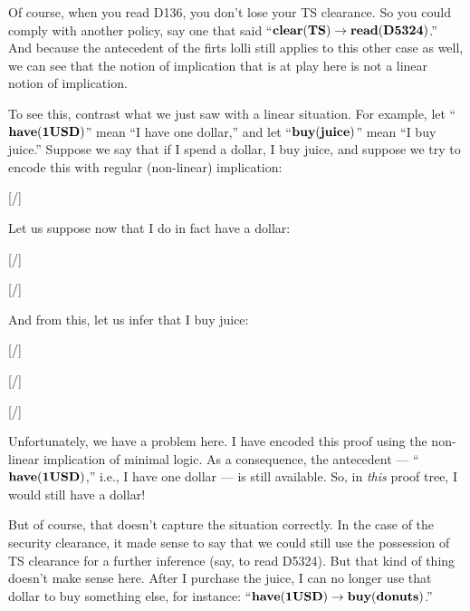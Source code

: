 \documentclass[../../../main.tex]{subfiles}
\begin{document}
Of course, when you read D136, you don't lose your TS clearance. So you could comply with another policy, say one that said ``$\nd{clear(TS) \impl/ read(D5324)}$.'' And because the antecedent of the firts lolli still applies to this other case as well, we can see that the notion of implication that is at play here is not a linear notion of implication.

To see this, contrast what we just saw with a linear situation. For example, let ``$\mathbf{have(1USD)}$'' mean ``I have one dollar,'' and let ``$\mathbf{buy(juice)}$'' mean ``I buy juice.'' Suppose we say that if I spend a dollar, I buy juice, and suppose we try to encode this with regular (non-linear) implication:

\begin{prooftree*}
  \hypo{}
  [\startrule/]{}
\end{prooftree*}

\noindent
Let us suppose now that I do in fact have a dollar:

\begin{prooftree*}
  \hypo{}
  [\startrule/]{}
  
  \hypo{}
  [\startrule/]{}
  
\end{prooftree*}

\noindent
And from this, let us infer that I buy juice:

\begin{prooftree*}
  \hypo{}
  [\startrule/]{}
  
  \hypo{}
  [\startrule/]{}
  
  [\implElim/]{}
\end{prooftree*}

\noindent
Unfortunately, we have a problem here. I have encoded this proof using the non-linear implication of minimal logic. As a consequence, the antecedent --- ``$\mathbf{have(1USD)}$,'' i.e., I have one dollar --- is still available. So, in \emph{this} proof tree, I would still have a dollar!

But of course, that doesn't capture the situation correctly. In the case of the security clearance, it made sense to say that we could still use the possession of TS clearance for a further inference (say, to read D5324). But that kind of thing doesn't make sense here. After I purchase the juice, I can no longer use that dollar to buy something else, for instance: ``$\nd{have(1USD) \impl/ buy(donuts)}$.'' 
\end{document}
